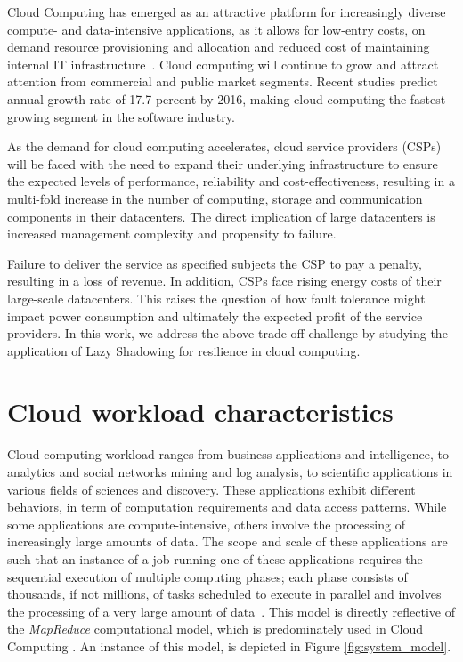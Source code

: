 Cloud Computing has emerged as an attractive platform for increasingly
diverse compute- and data-intensive applications, as it allows for
low-entry costs, on demand resource provisioning and allocation and
reduced cost of maintaining internal IT
infrastructure~\cite{tchana_cits_2012}. Cloud computing will continue
to grow and attract attention from commercial and public market
segments. Recent studies predict annual growth rate of 17.7 percent by
2016, making cloud computing the fastest growing segment in the
software industry.

As the demand for cloud computing
accelerates, cloud service providers (CSPs) will be faced with the
need to expand their underlying infrastructure to ensure the expected
levels of performance, reliability and cost-effectiveness, resulting
in a multi-fold increase in the number of computing, storage and
communication components in their datacenters. The direct implication of large datacenters is increased management complexity and propensity to
failure.

Failure to deliver
the service as specified subjects the CSP to pay a penalty,
resulting in a loss of revenue. In addition, CSPs face rising energy costs of their large-scale
datacenters. This raises the question of how
fault tolerance might impact power consumption and ultimately the
expected profit of the service providers. In this work, we address the above trade-off challenge 
by studying the application of Lazy Shadowing for resilience in cloud computing.

\section{Cloud workload characteristics}

Cloud computing workload ranges from business applications and
intelligence, to analytics and social networks mining and log
analysis, to scientific applications in various fields of sciences and
discovery. These applications exhibit different behaviors, in term of
computation requirements and data access patterns. While some
applications are compute-intensive, others involve the processing of
increasingly large amounts of data. The scope and scale of these
applications are such that an instance of a job running one of these
applications requires the sequential execution of multiple computing
phases; each phase consists of thousands, if not millions, of tasks
scheduled to execute in parallel and involves the processing of a very
large amount of data~\cite{lin2010data,Ferdman:2012:CCS:2150976.2150982}. This
model is directly reflective of the \emph{MapReduce} computational
model, which is predominately used in
Cloud Computing \cite{mrbs}.  An instance of this model, is depicted in Figure \ref{fig:system_model}.


